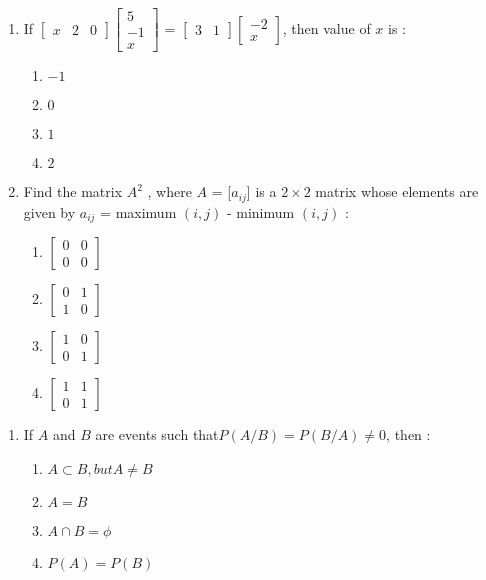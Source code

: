\documentclass{article}
\providecommand{\myvec}[1]{\ensuremath{\begin{bmatrix}#1\end{bmatrix}}}
\begin{document}
\begin{enumerate}
        \item If $\myvec{x & 2 & 0} \myvec {5 \\ -1 \\ x}$ = $ \myvec{3 & 1} \myvec {-2 \\ x}$, then value of $x$ is :
                \begin{enumerate}[label=(\Alph*)]
                \item $-1$
                        \item $0$
                        \item $1$
                        \item $2$
\end{enumerate}
	\item Find the matrix $A ^{2}$ , where $A$ = [$a_{ij}$] is a $2\times2$ matrix whose elements are given by $a_{ij}$ = maximum $(i,j)$ - minimum $(i,j)$ :
                \begin{enumerate}[label=(\Alph*)]
                \item $\myvec{0 & 0\\0 & 0}$
                        \item $\myvec{0 & 1\\1 & 0}$
                                \item $\myvec{1 & 0 \\0 & 1}$
                                        \item $\myvec{1 & 1\\0 & 1}$
		\end{enumerate}
		\end{enumerate}
				\begin{enumerate}
						\section{PROBABILITY}
\item If $A$ and $B$ are events such that$ P(A/B) = P(B/A) \neq 0$, then
:
                \begin{enumerate}[label=(\Alph*)]
                                                                                                                                                                                 \item $A \subset B, but A \neq B$
                \item $A = B$
                \item $A\cap B = \phi$
                \item $P(A) = P(B)$                                                                                                                                                              \end{enumerate}
				\end{enumerate}
\end{document}
